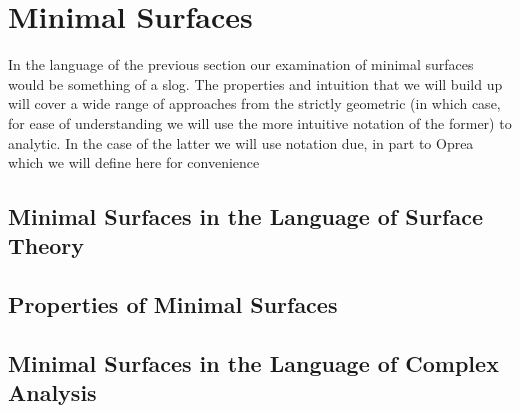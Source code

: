 \section{Minimal Surfaces}

In the language of the previous section our examination of minimal surfaces would be something of a slog. The properties and intuition that we will build up will cover a wide range of approaches from the strictly geometric (in which case, for ease of understanding we will use the more intuitive notation of the former) to analytic. In the case of the latter we will use notation due, in part to Oprea which we will define here for convenience

\subsection{Minimal Surfaces in the Language of Surface Theory}

\subsection{Properties of Minimal Surfaces}

\subsection{Minimal Surfaces in the Language of Complex Analysis}